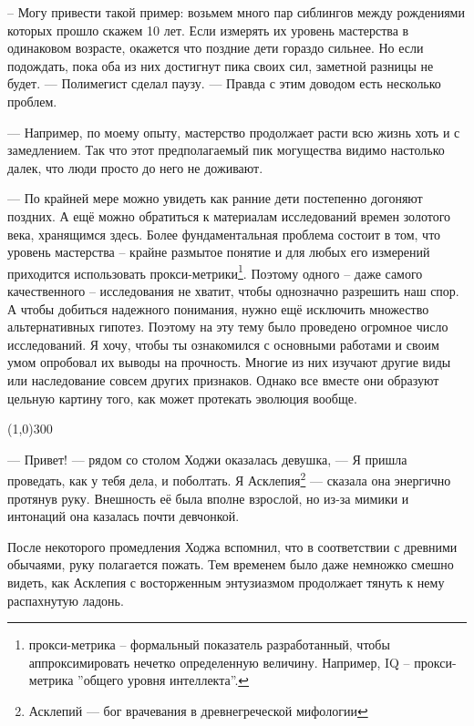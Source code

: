 \documentclass[12pt,a4paper]{article}
\newcommand{\sep}{
	\begin{center}
		\line(1,0){300}
	\end{center}
}
\begin{document}
-- Могу привести такой пример: возьмем много пар сиблингов между рождениями которых прошло скажем 10 лет. Если измерять их уровень мастерства в одинаковом возрасте, окажется что поздние дети гораздо сильнее. Но если подождать, пока оба из них достигнут пика своих сил, заметной разницы не будет. --- Полимегист сделал паузу. --- Правда с этим доводом есть несколько проблем.

--- Например, по моему опыту, мастерство продолжает расти всю жизнь хоть и с замедлением. Так что этот предполагаемый пик могущества видимо настолько далек, что люди просто до него не доживают.

--- По крайней мере можно увидеть как ранние дети постепенно догоняют поздних. А ещё можно обратиться к материалам исследований времен золотого века, хранящимся здесь. Более фундаментальная проблема состоит в том, что уровень мастерства -- крайне размытое понятие и для любых его измерений приходится использовать прокси-метрики\footnote{прокси-метрика -- формальный показатель разработанный, чтобы аппроксимировать нечетко определенную величину. Например, IQ -- прокси-метрика ''общего уровня интеллекта''.}. Поэтому одного -- даже самого качественного -- исследования не хватит, чтобы однозначно разрешить наш спор. А чтобы добиться надежного понимания, нужно ещё исключить множество альтернативных гипотез. Поэтому на эту тему было проведено огромное число исследований. Я хочу, чтобы ты ознакомился с основными работами и своим умом опробовал их выводы на прочность. Многие из них изучают другие виды или наследование совсем других признаков. Однако все вместе они образуют цельную картину того, как может протекать эволюция вообще.





\sep

--- Привет! --- рядом со столом Ходжи оказалась девушка, --- Я пришла проведать, как у тебя дела, и поболтать. Я Асклепия\footnote{Асклепий --- бог врачевания в древнегреческой мифологии} --- сказала она энергично протянув руку. Внешность её была вполне взрослой, но из-за мимики и интонаций она казалась почти девчонкой.

После некоторого промедления Ходжа вспомнил, что в соответствии с древними обычаями, руку полагается пожать. Тем временем было даже немножко смешно видеть, как Асклепия с восторженным энтузиазмом продолжает тянуть к нему распахнутую ладонь.
\end{document}
